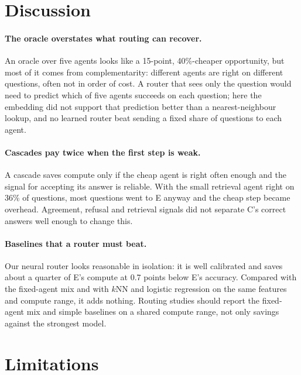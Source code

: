 \documentclass[11pt,a4paper]{article}
\begin{document}
\section{Discussion}

\paragraph{The oracle overstates what routing can recover.} An oracle over five agents looks like a 15-point,
40\%-cheaper opportunity, but most of it comes from complementarity: different agents are right on different
questions, often not in order of cost. A router that sees only the question would need to predict which of five
agents succeeds on each question; here the embedding did not support that prediction better than a nearest-neighbour
lookup, and no learned router beat sending a fixed share of questions to each agent.

\paragraph{Cascades pay twice when the first step is weak.} A cascade saves compute only if the cheap agent is right
often enough and the signal for accepting its answer is reliable. With the small retrieval agent right on 36\% of
questions, most questions went to E anyway and the cheap step became overhead. Agreement, refusal and retrieval
signals did not separate C's correct answers well enough to change this.

\paragraph{Baselines that a router must beat.} Our neural router looks reasonable in isolation: it is well calibrated
and saves about a quarter of E's compute at 0.7 points below E's accuracy. Compared with the fixed-agent mix and with
$k$NN and logistic regression on the same features and compute range, it adds nothing. Routing studies should report
the fixed-agent mix and simple baselines on a shared compute range, not only savings against the strongest model.

\section{Limitations}
\end{document}
